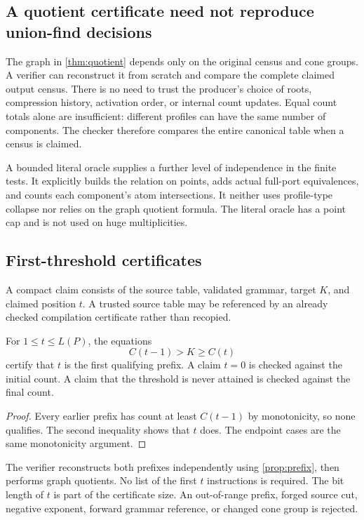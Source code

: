 \subsection{A quotient certificate need not reproduce union-find decisions}

The graph in \cref{thm:quotient} depends only on the original census and
cone groups. A verifier can reconstruct it from scratch and compare the
complete claimed output census. There is no need to trust the producer's
choice of roots, compression history, activation order, or internal count
updates. Equal count totals alone are insufficient: different profiles can
have the same number of components. The checker therefore compares the
entire canonical table when a census is claimed.

A bounded literal oracle supplies a further level of independence in the
finite tests. It explicitly builds the relation on points, adds actual
full-port equivalences, and counts each component's atom intersections.
It neither uses profile-type collapse nor relies on the graph quotient
formula. The literal oracle has a point cap and is not used on huge
multiplicities.

\subsection{First-threshold certificates}

A compact claim consists of the source table, validated grammar, target $K$,
and claimed position $t$. A trusted source table may be referenced by an
already checked compilation certificate rather than recopied.

\begin{proposition}
\label{prop:threshold-cert}
For $1\le t\le L(P)$, the equations
\[
 C(t-1)>K\ge C(t)
\]
certify that $t$ is the first qualifying prefix. A claim $t=0$ is checked
against the initial count. A claim that the threshold is never attained is
checked against the final count.
\end{proposition}

\begin{proof}
Every earlier prefix has count at least $C(t-1)$ by monotonicity, so none
qualifies. The second inequality shows that $t$ does. The endpoint cases
are the same monotonicity argument.
\end{proof}

The verifier reconstructs both prefixes independently using
\cref{prop:prefix}, then performs graph quotients. No list of the first
$t$ instructions is required. The bit length of $t$ is part of the
certificate size. An out-of-range prefix, forged source cut, negative
exponent, forward grammar reference, or changed cone group is rejected.

